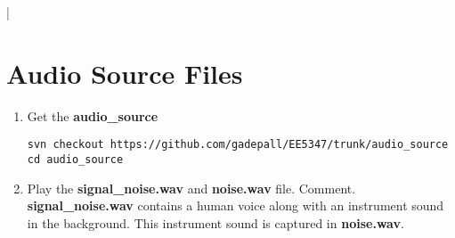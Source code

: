 |\documentclass[journal,12pt,twocolumn]{IEEEtran}
\renewcommand\thesection{\arabic{section}}
\begin{document}
\section{Audio Source Files}
\begin{enumerate}[label=\thesection.\arabic*
,ref=\thesection.\theenumi]
\item Get the \textbf{audio\_source}
\begin{lstlisting}
svn checkout https://github.com/gadepall/EE5347/trunk/audio_source
cd audio_source
\end{lstlisting}
\item Play the \textbf{signal\_noise.wav} and \textbf{noise.wav} file. Comment.
\\
\solution
\textbf{signal\_noise.wav}  contains a human voice along 
with an instrument sound in the background.  This instrument sound
is captured in \textbf{noise.wav}.
\end{enumerate}
%
\end{document}
